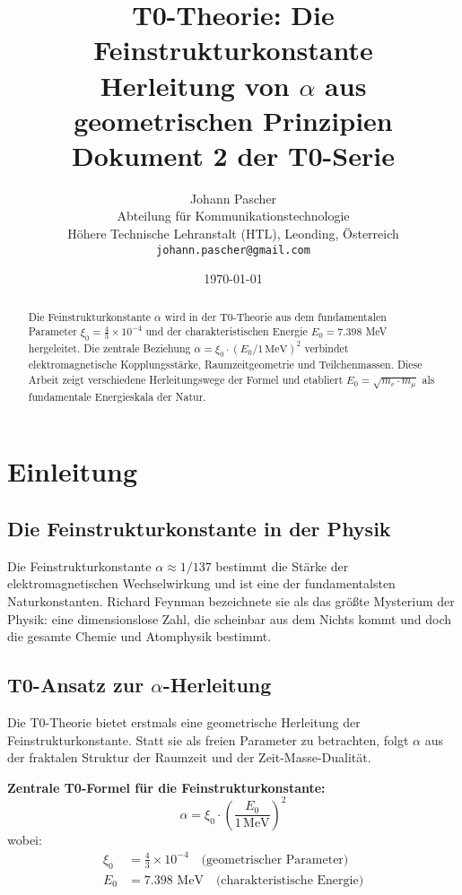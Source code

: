 \documentclass[12pt,a4paper]{article}
\title{\textbf{T0-Theorie: Die Feinstrukturkonstante}\\[0.5cm]
	\large Herleitung von $\alpha$ aus geometrischen Prinzipien\\[0.3cm]
	\normalsize Dokument 2 der T0-Serie}
\author{Johann Pascher\\
	Abteilung für Kommunikationstechnologie\\
	Höhere Technische Lehranstalt (HTL), Leonding, Österreich\\
	\texttt{johann.pascher@gmail.com}}
\date{\today}
\newcommand{\xipar}{\xi_0}
\newcommand{\Ezero}{E_0}
\begin{document}
	
	\maketitle
	
	\begin{abstract}
		Die Feinstrukturkonstante $\alpha$ wird in der T0-Theorie aus dem fundamentalen Parameter $\xipar = \frac{4}{3} \times 10^{-4}$ und der charakteristischen Energie $\Ezero = 7.398$ MeV hergeleitet. Die zentrale Beziehung $\alpha = \xipar \cdot (\Ezero/1\,\text{MeV})^2$ verbindet elektromagnetische Kopplungsstärke, Raumzeitgeometrie und Teilchenmassen. Diese Arbeit zeigt verschiedene Herleitungswege der Formel und etabliert $\Ezero = \sqrt{m_e \cdot m_\mu}$ als fundamentale Energieskala der Natur.
	\end{abstract}
	
	\tableofcontents
	\newpage
	
	\section{Einleitung}
	
	\subsection{Die Feinstrukturkonstante in der Physik}
	
	Die Feinstrukturkonstante $\alpha \approx 1/137$ bestimmt die Stärke der elektromagnetischen Wechselwirkung und ist eine der fundamentalsten Naturkonstanten. Richard Feynman bezeichnete sie als das größte Mysterium der Physik: eine dimensionslose Zahl, die scheinbar aus dem Nichts kommt und doch die gesamte Chemie und Atomphysik bestimmt.
	
	\subsection{T0-Ansatz zur $\alpha$-Herleitung}
	
	Die T0-Theorie bietet erstmals eine geometrische Herleitung der Feinstrukturkonstante. Statt sie als freien Parameter zu betrachten, folgt $\alpha$ aus der fraktalen Struktur der Raumzeit und der Zeit-Masse-Dualität.
	
	\begin{keyresult}
		\textbf{Zentrale T0-Formel für die Feinstrukturkonstante:}
		\begin{equation}
			\boxed{\alpha = \xipar \cdot \left(\frac{\Ezero}{1\,\text{MeV}}\right)^2}
			\label{eq:alpha_main}
		\end{equation}
		wobei:
		\begin{align}
			\xipar &= \frac{4}{3} \times 10^{-4} \quad \text{(geometrischer Parameter)}\\
			\Ezero &= 7.398 \text{ MeV} \quad \text{(charakteristische Energie)}
		\end{align}
	\end{keyresult}
	
\end{document}
